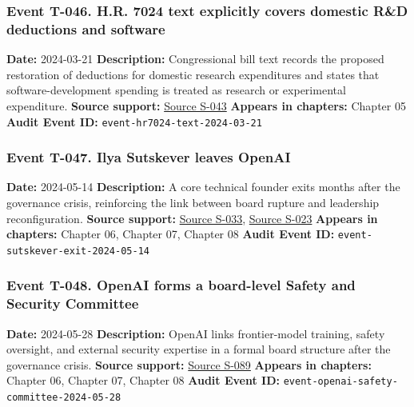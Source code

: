 \documentclass[
  american,
  11pt,
  letterpaper,
]{article}
\begin{document}
\subsubsection{Event T-046. H.R. 7024 text explicitly covers domestic
R\&D deductions and
software}\label{event-t-046-h-r-7024-text-explicitly-covers-domestic-r-d-deductions-and-software}

\textbf{Date:} 2024-03-21 \textbf{Description:} Congressional bill text
records the proposed restoration of deductions for domestic research
expenditures and states that software-development spending is treated as
research or experimental expenditure. \textbf{Source support:}
\hyperref[source-s-043-h-r-7024-text-deduction-for-domestic-research-and-experimental-expenditures]{Source
S-043} \textbf{Appears in chapters:} Chapter 05 \textbf{Audit Event ID:}
\texttt{event-hr7024-text-2024-03-21}

\subsubsection{Event T-047. Ilya Sutskever leaves
OpenAI}\label{event-t-047-ilya-sutskever-leaves-openai}

\textbf{Date:} 2024-05-14 \textbf{Description:} A core technical founder
exits months after the governance crisis, reinforcing the link between
board rupture and leadership reconfiguration. \textbf{Source support:}
\hyperref[source-s-033-openai-co-founder-ilya-sutskever-to-exit-firm]{Source
S-033},
\hyperref[source-s-023-openai-co-founder-ilya-sutskever-announces-departure-from-chatgpt-maker]{Source
S-023} \textbf{Appears in chapters:} Chapter 06, Chapter 07, Chapter 08
\textbf{Audit Event ID:} \texttt{event-sutskever-exit-2024-05-14}

\subsubsection{Event T-048. OpenAI forms a board-level Safety and
Security
Committee}\label{event-t-048-openai-forms-a-board-level-safety-and-security-committee}

\textbf{Date:} 2024-05-28 \textbf{Description:} OpenAI links
frontier-model training, safety oversight, and external security
expertise in a formal board structure after the governance crisis.
\textbf{Source support:}
\hyperref[source-s-089-openai-board-forms-safety-and-security-committee]{Source
S-089} \textbf{Appears in chapters:} Chapter 06, Chapter 07, Chapter 08
\textbf{Audit Event ID:}
\texttt{event-openai-safety-committee-2024-05-28}
\end{document}
